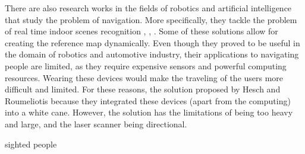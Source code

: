 There are also research works in the fields of robotics and artificial intelligence that study the problem of navigation. More specifically, they tackle the problem of real time indoor scenes recognition \cite{espinace}, \cite{quattoni}, \cite{bosch}. Some of these solutions  allow for creating the reference map dynamically. Even though they proved to be useful in the domain of robotics and automotive industry, their applications to navigating people are limited, as they require expensive sensors and powerful computing resources. Wearing these devices would make the traveling of the users more difficult and limited. For these reasons, the solution proposed by Hesch and Roumeliotis \cite{hesch} because they integrated these devices (apart from the computing) into a white cane. However, the solution has the limitations of being too heavy and large, and the laser scanner being directional.



sighted people
